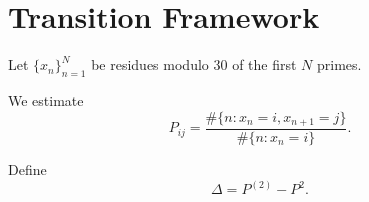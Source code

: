 \section{Transition Framework}

Let $\{x_n\}_{n=1}^{N}$ be residues modulo $30$ of the first $N$ primes.

We estimate
\[
P_{ij} = \frac{\#\{n : x_n = i, x_{n+1} = j\}}{\#\{n : x_n = i\}}.
\]

Define
\[
\Delta = P^{(2)} - P^2.
\]